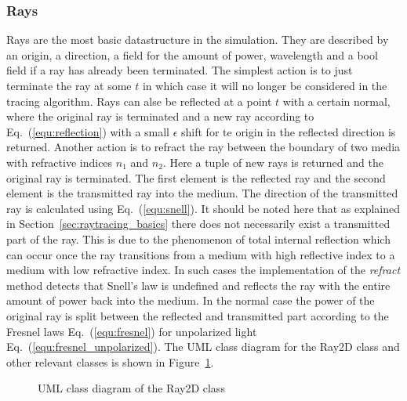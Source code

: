 \documentclass[a4paper,10pt]{article}
\newcommand{\equref}[1]{Eq.~(\ref{#1})}
\newcommand{\secref}[1]{Section~\ref{#1}}
\newcommand{\figref}[1]{Figure~\ref{#1}}
\begin{document}
    \subsubsection{Rays}

    Rays are the most basic datastructure in the simulation.
    They are described by an origin, a direction, a field for the
    amount of power, wavelength and a bool field if a ray has
    already been terminated.
    The simplest action is to just terminate the ray at some $t$
    in which case it will no longer be considered in the tracing
    algorithm.
    Rays can alse be reflected at a point $t$ with a certain normal, 
    where the original ray is terminated and a new ray according to \equref{equ:reflection} with a small
    $\epsilon$ shift for te origin in the reflected direction is returned.
    Another action is to refract the ray between the boundary
    of two media with refractive indices $n_1$ and $n_2$.
    Here a tuple of new rays is returned and the original ray
    is terminated.
    The first element is the reflected ray and the second
    element is the transmitted ray into the medium.
    The direction of the transmitted ray is calculated using
    \equref{equ:snell}.
    It should be noted here that as explained in
    \secref{sec:raytracing_basics}
    there does not necessarily exist a transmitted part of the ray.
    This is due to the phenomenon of total internal reflection
    which can occur once the ray transitions from a medium with high
    reflective index to a medium with low refractive index.
    In such cases the implementation of the \emph{refract} method
    detects that Snell's law is undefined and reflects the ray
    with the entire amount of power back into the medium.
    In the normal case the power of the original ray
    is split between the reflected and transmitted part according
    to the Fresnel laws \equref{equ:fresnel} for unpolarized
    light \equref{equ:fresnel_unpolarized}. 
    The UML class diagram for the Ray2D class and other relevant
    classes is shown in \figref{fig:uml_ray2d}.

    \begin{center}
    \begin{figure}
    \centering
    \caption{UML class diagram of the Ray2D class}
    \label{fig:uml_ray2d}
    \end{figure}
    \end{center}
\end{document}
